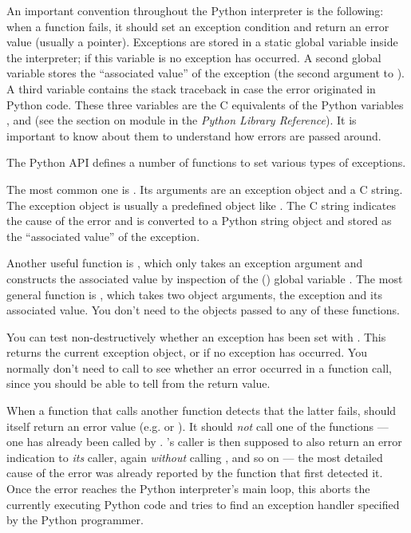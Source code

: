 \documentclass{manual}
\begin{document}
An important convention throughout the Python interpreter is the
following: when a function fails, it should set an exception condition
and return an error value (usually a \NULL{} pointer).  Exceptions
are stored in a static global variable inside the interpreter; if this
variable is \NULL{} no exception has occurred.  A second global
variable stores the ``associated value'' of the exception (the second
argument to ).  A third variable contains the stack
traceback in case the error originated in Python code.  These three
variables are the C equivalents of the Python variables
,  and  (see
the section on module  in the \emph{Python Library
Reference}).  It is important to know about them to understand how
errors are passed around.

The Python API defines a number of functions to set various types of
exceptions.

The most common one is .  Its arguments
are an exception object and a C string.  The exception object is
usually a predefined object like .  The
C string indicates the cause of the error and is converted to a
Python string object and stored as the ``associated value'' of the
exception.

Another useful function is , which only
takes an exception argument and constructs the associated value by
inspection of the (\UNIX{}) global variable .  The most
general function is , which takes two object
arguments, the exception and its associated value.  You don't need to
 the objects passed to any of these functions.

You can test non-destructively whether an exception has been set with
.  This returns the current exception object,
or \NULL{} if no exception has occurred.  You normally don't need
to call  to see whether an error occurred in a
function call, since you should be able to tell from the return value.

When a function  that calls another function  detects
that the latter fails,  should itself return an error value
(e.g. \NULL{} or ).  It should \emph{not} call one of the
 functions --- one has already been called by .
's caller is then supposed to also return an error indication
to \emph{its} caller, again \emph{without} calling ,
and so on --- the most detailed cause of the error was already
reported by the function that first detected it.  Once the error
reaches the Python interpreter's main loop, this aborts the currently
executing Python code and tries to find an exception handler specified
by the Python programmer.
\end{document}
